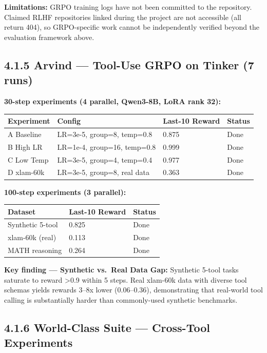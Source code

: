 \documentclass[
  american,
  11pt,
  a4paper,
  oneside]{report}
\newcounter{none} %
\begin{document}
\textbf{Limitations:} GRPO training logs have not been committed to the
repository. Claimed RLHF repositories linked during the project are not
accessible (all return 404), so GRPO-specific work cannot be
independently verified beyond the evaluation framework above.

\subsection{4.1.5 Arvind --- Tool-Use GRPO on Tinker (7
runs)}\label{arvind-tool-use-grpo-on-tinker-7-runs}

\textbf{30-step experiments (4 parallel, Qwen3-8B, LoRA rank 32):}

{\def\LTcaptype{none} %
\begin{longtable}[]{@{}llll@{}}
\toprule\noalign{}
Experiment & Config & Last-10 Reward & Status \\
\midrule\noalign{}
\endhead
\bottomrule\noalign{}
\endlastfoot
A Baseline & LR=3e-5, group=8, temp=0.8 & 0.875 & Done \\
B High LR & LR=1e-4, group=16, temp=0.8 & 0.999 & Done \\
C Low Temp & LR=3e-5, group=4, temp=0.4 & 0.977 & Done \\
D xlam-60k & LR=3e-5, group=8, real data & 0.363 & Done \\
\end{longtable}
}

\textbf{100-step experiments (3 parallel):}

{\def\LTcaptype{none} %
\begin{longtable}[]{@{}lll@{}}
\toprule\noalign{}
Dataset & Last-10 Reward & Status \\
\midrule\noalign{}
\endhead
\bottomrule\noalign{}
\endlastfoot
Synthetic 5-tool & 0.825 & Done \\
xlam-60k (real) & 0.113 & Done \\
MATH reasoning & 0.264 & Done \\
\end{longtable}
}

\textbf{Key finding --- Synthetic vs.~Real Data Gap:} Synthetic 5-tool
tasks saturate to reward \textgreater0.9 within 5 steps. Real xlam-60k
data with diverse tool schemas yields rewards 3--8x lower (0.06--0.36),
demonstrating that real-world tool calling is substantially harder than
commonly-used synthetic benchmarks.

\subsection{4.1.6 World-Class Suite --- Cross-Tool
Experiments}\label{world-class-suite-cross-tool-experiments}
\end{document}
